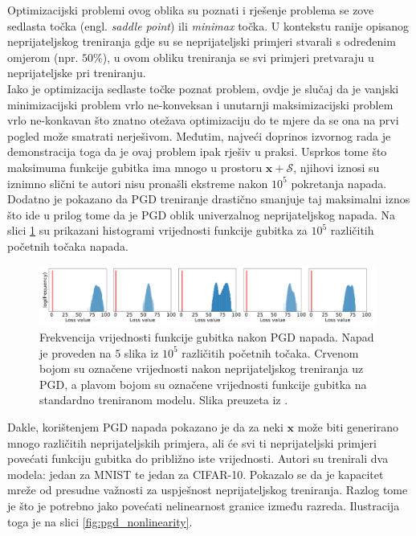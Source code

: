 \documentclass[utf8, diplomski]{fer}
\begin{document}
Optimizacijski problemi ovog oblika su poznati i rješenje problema se zove sedlasta točka (engl. \textit{saddle point}) ili \textit{minimax} točka. U kontekstu ranije opisanog neprijateljskog treniranja gdje su se neprijateljski primjeri stvarali s određenim omjerom (npr. $50\%$), u ovom obliku treniranja se svi primjeri pretvaraju u neprijateljske pri treniranju. \\
Iako je optimizacija sedlaste točke poznat problem, ovdje je slučaj da je vanjski minimizacijski problem vrlo ne-konveksan i unutarnji maksimizacijski problem vrlo ne-konkavan što znatno otežava optimizaciju do te mjere da se ona na prvi pogled može smatrati nerješivom. Međutim, najveći doprinos izvornog rada \citep{Madry2017TowardsDL} je demonstracija toga da je ovaj problem ipak rješiv u praksi. Usprkos tome što maksimuma funkcije gubitka ima mnogo u prostoru $\boldsymbol{x} + \mathcal{S}$, njihovi iznosi su iznimno slični te autori nisu pronašli ekstreme nakon $10^{5}$ pokretanja napada. Dodatno je pokazano da PGD treniranje drastično smanjuje taj maksimalni iznos što ide u prilog tome da je PGD oblik univerzalnog neprijateljskog napada. Na slici \ref{fig:pgd_histogram} su prikazani histogrami vrijednosti funkcije gubitka za $10^{5}$ različitih početnih točaka napada. 

\begin{figure}[H]
\centering
\includegraphics[width=0.99\textwidth,keepaspectratio]{img/other/pgd_histogram.png}
\caption{Frekvencija vrijednosti funkcije gubitka nakon PGD napada. Napad je proveden na $5$ slika iz $10^{5}$ različitih početnih točaka. Crvenom bojom su označene vrijednosti nakon neprijateljskog treniranja uz PGD, a plavom bojom su označene vrijednosti funkcije gubitka na standardno treniranom modelu. Slika preuzeta iz \citep{Madry2017TowardsDL}.}
\label{fig:pgd_histogram}
\end{figure}

Dakle, korištenjem PGD napada pokazano je da za neki $\boldsymbol{x}$ može biti generirano mnogo različitih neprijateljskih primjera, ali će svi ti neprijateljski primjeri povećati funkciju gubitka do približno iste vrijednosti. Autori su trenirali dva modela: jedan za MNIST te jedan za CIFAR-10. Pokazalo se da je kapacitet mreže od presudne važnosti za uspješnost neprijateljskog treniranja. Razlog tome je što je potrebno jako povećati nelinearnost granice između razreda. Ilustracija toga je na slici \ref{fig:pgd_nonlinearity}. 
\end{document}

